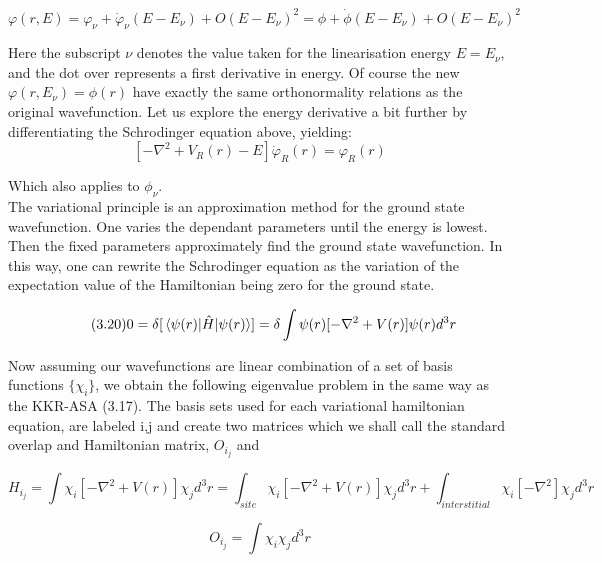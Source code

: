 \documentclass[12pt]{article}
\begin{document}
\begin{equation} \label{3.18} \tag{3.18}
\varphi(r,E) = \varphi_{\nu} + \dot{\varphi}_{\nu}(E-E_\nu)+O(E-E_\nu)^2=\phi + \dot{\phi}(E-E_\nu)+O(E-E_\nu)^2
\end{equation}

Here the subscript $\nu$ denotes the value taken for the linearisation energy $E=E_\nu$, and the dot over represents a first derivative in energy. Of course the new $\varphi(r,E_\nu)=\phi(r)$ have exactly the same orthonormality relations as the original wavefunction. Let us explore the energy derivative a bit further by differentiating the Schrodinger equation above, yielding:
\begin{equation} \label{3.18} \tag{3.19}
[-\nabla^2+V_R(r)-E]\dot{\varphi}_R(r)=\varphi_R(r)
\end{equation}

Which also applies to $\phi_{\nu}$. \\
The variational principle is an approximation method for the ground state wavefunction. One varies the dependant parameters until the energy is lowest. Then the fixed parameters approximately find the ground state wavefunction. In this way, one can rewrite the Schrodinger equation as the variation of the expectation value of the Hamiltonian being zero for the ground state.

\begin{equation} \label{3.18} \tag{3.20}
0=\delta [\expval{\hat{H}}{\psi(r)}]=\delta \int \psi(r) [-\nabla^2+V(r)] \psi(r) d^3r
\end{equation}

Now assuming our wavefunctions are linear combination of a set of basis functions $\{\chi_i\}$, we obtain the following eigenvalue problem in the same way as the KKR-ASA (3.17). The basis sets used for each variational hamiltonian equation, are labeled i,j and create two matrices which we shall call the standard overlap and Hamiltonian matrix, $O_i_j$ and %

\begin{equation} \label{3.19} \tag{3.21}
H_i_j=\int \chi_i[-\nabla^2+V(r)]\chi_j d^3r=\int_{site} \chi_i[-\nabla^2+V(r)]\chi_j d^3r+\int_{interstitial} \chi_i[-\nabla^2]\chi_j d^3r
\end{equation}

\begin{equation} \label{3.20} \tag{3.22}
O_i_j=\int \chi_i\chi_j d^3r
\end{equation}
\end{document}
